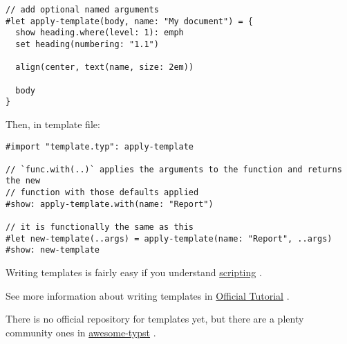 \begin{verbatim}
// add optional named arguments
#let apply-template(body, name: "My document") = {
  show heading.where(level: 1): emph
  set heading(numbering: "1.1")

  align(center, text(name, size: 2em))

  body
}
\end{verbatim}

Then, in template file:

\begin{verbatim}
#import "template.typ": apply-template

// `func.with(..)` applies the arguments to the function and returns the new
// function with those defaults applied
#show: apply-template.with(name: "Report")

// it is functionally the same as this
#let new-template(..args) = apply-template(name: "Report", ..args)
#show: new-template
\end{verbatim}

Writing templates is fairly easy if you understand
\href{../scripting/index.html}{scripting} .

See more information about writing templates in
\href{https://typst.app/docs/tutorial/making-a-template/}{Official
Tutorial} .

There is no official repository for templates yet, but there are a
plenty community ones in
\href{https://github.com/qjcg/awesome-typst?ysclid=lj8pur1am7431908794\#general}{awesome-typst}
.
